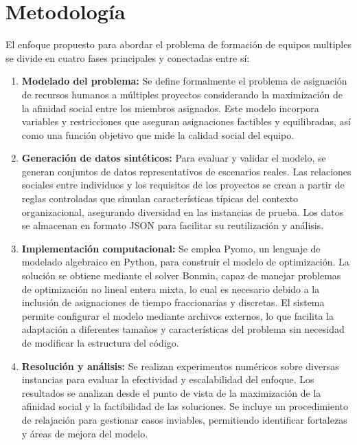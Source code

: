 \documentclass[conference]{IEEEtran}
\begin{document}
\section{Metodología}

El enfoque propuesto para abordar el problema de formación de equipos multiples se divide en cuatro fases principales y conectadas entre sí:

\begin{enumerate}
    \item \textbf{Modelado del problema:} Se define formalmente el problema de asignación de recursos humanos a múltiples proyectos considerando la maximización de la afinidad social entre los miembros asignados. Este modelo incorpora variables y restricciones que aseguran asignaciones factibles y equilibradas, así como una función objetivo que mide la calidad social del equipo.

    \item \textbf{Generación de datos sintéticos:} Para evaluar y validar el modelo, se generan conjuntos de datos representativos de escenarios reales. Las relaciones sociales entre individuos y los requisitos de los proyectos se crean a partir de reglas controladas que simulan características típicas del contexto organizacional, asegurando diversidad en las instancias de prueba. Los datos se almacenan en formato JSON para facilitar su reutilización y análisis.

    \item \textbf{Implementación computacional:} Se emplea Pyomo\cite{pyomo_hart2011}, un lenguaje de modelado algebraico en Python, para construir el modelo de optimización. La solución se obtiene mediante el solver Bonmin\cite{bonmin_bonami2008}, capaz de manejar problemas de optimización no lineal entera mixta, lo cual es necesario debido a la inclusión de asignaciones de tiempo fraccionarias y discretas. El sistema permite configurar el modelo mediante archivos externos, lo que facilita la adaptación a diferentes tamaños y características del problema sin necesidad de modificar la estructura del código.

    \item \textbf{Resolución y análisis:} Se realizan experimentos numéricos sobre diversas instancias para evaluar la efectividad y escalabilidad del enfoque. Los resultados se analizan desde el punto de vista de la maximización de la afinidad social y la factibilidad de las soluciones. Se incluye un procedimiento de relajación para gestionar casos inviables, permitiendo identificar fortalezas y áreas de mejora del modelo.
\end{enumerate}
\end{document}
